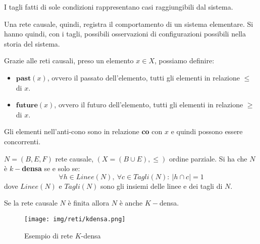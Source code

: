 I tagli fatti di sole condizioni rappresentano casi raggiungibili dal sistema.

Una rete causale, quindi, registra il comportamento di un sistema elementare. Si
hanno quindi, con i tagli, possibili osservazioni di configurazioni possibili
nella storia del sistema.
\begin{definizione}
    Grazie alle reti causali, preso un elemento $x \in X$, possiamo definire:
    \begin{itemize}
        \item $\textbf{past}(x)$, ovvero il passato dell'elemento, tutti gli
              elementi in relazione $\leq$ di $x$.
        \item $\textbf{future}(x)$, ovvero il futuro dell'elemento, tutti gli
              elementi in relazione $\geq$ di $x$.
    \end{itemize}
    Gli elementi nell'anti-cono sono in relazione \textbf{co} con $x$ e quindi
    possono essere concorrenti.
\end{definizione}
\begin{definizione}
    $N = (B, E, F)$ rete causale, $(X = (B \cup E), \leq)$ ordine parziale. Si
    ha che $N$ è \textbf{$k-$densa} se e solo se:
    \begin{equation}
        \forall h \in Linee(N), \ \forall c \in Tagli(N): \ |h \cap c| = 1
    \end{equation}
    dove $Linee(N)$ e $Tagli(N)$ sono gli insiemi delle linee e dei tagli di $N$.
\end{definizione}
\begin{nota}
    Se la rete causale $N$ è finita allora $N$ è anche $K-$densa.
\end{nota}
\begin{figure}[!ht]
    \centering
    \texttt{[image: img/reti/kdensa.png]}
    \caption{Esempio di rete $K$-densa}
\end{figure}
